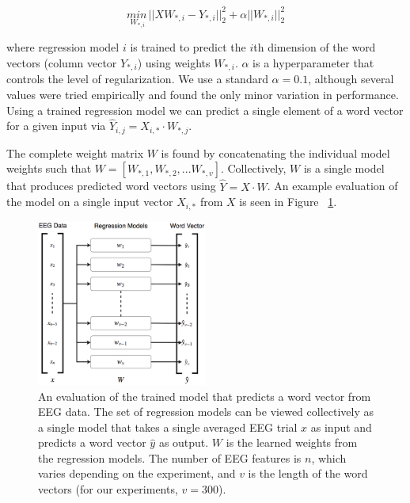 \begin{equation}
  \underset{W_{*,i}}{min\,} {|| X W_{*, i} - Y_{*, i}||_2^2 + \alpha ||W_{*, i}||_2^2}
  \label{eq:ridge}
\end{equation}

\noindent where regression model $i$ is trained to predict the $i$th dimension of the word vectors (column vector $Y_{*,i}$) using weights $W_{*,i}$. $\alpha$ is a hyperparameter that controls the level of regularization. We use a standard $\alpha = 0.1$, although several values were tried empirically and found the only minor variation in performance. Using a trained regression model we can predict a single element of a word vector for a given input via $\hat{Y}_{i,j} = X_{i, *} \cdot W_{*,j}$.

The complete weight matrix $W$ is found by concatenating the individual model weights such that $W = [ W_{*,1}, W_{*,2}, ... W_{*,v} ]$. Collectively, $W$ is a single model that produces predicted word vectors using $\hat{Y} = X \cdot W$. An example evaluation of the model on a single input vector $X_{i,*}$ from $X$ is seen in Figure ~\ref{fig:features}.

\begin{figure}[t]
  \centering
  \includegraphics[width=0.5\textwidth]{figures/features}
  \caption{An evaluation of the trained model that predicts a word vector from EEG data. The set of regression models can be viewed collectively as a single model that takes a single averaged EEG trial $x$ as input and predicts a word vector $\hat{y}$ as output. $W$ is the learned weights from the regression models. The number of EEG features is $n$, which varies depending on the experiment, and $v$ is the length of the word vectors (for our experiments, $v=300$).}
  \label{fig:features}
\end{figure}

